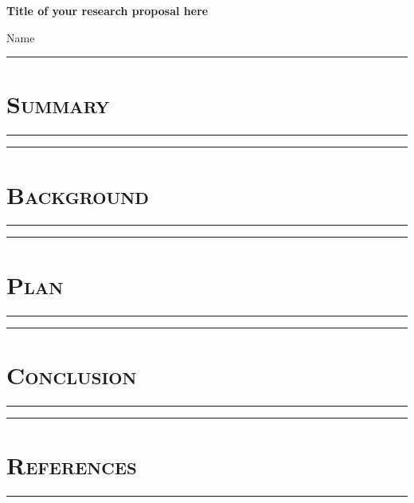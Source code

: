 \documentclass[10pt]{article} %
\begin{document}
\begin{center}
{\bf Title of your research proposal here} %
\end{center}

\begin{center}
Name
\end{center}

\begin{center}
    \par\noindent\rule{\textwidth}{0.2pt}
    \section*{\textsc{\textmd{Summary}}}
    \par\noindent\rule{\textwidth}{0.2pt}
\end{center}


\begin{center}
    \par\noindent\rule{\textwidth}{0.2pt}
    \section*{\textsc{\textmd{Background}}}
    \par\noindent\rule{\textwidth}{0.2pt}
\end{center}


\begin{center}
    \par\noindent\rule{\textwidth}{0.2pt}
    \section*{\textsc{\textmd{Plan}}}
    \par\noindent\rule{\textwidth}{0.2pt}
\end{center}


\begin{center}
    \par\noindent\rule{\textwidth}{0.2pt}
    \section*{\textsc{\textmd{Conclusion}}}
    \par\noindent\rule{\textwidth}{0.2pt}
\end{center}


\begin{center}
    \par\noindent\rule{\textwidth}{0.2pt}
    \section*{\textsc{\textmd{References}}}
    \par\noindent\rule{\textwidth}{0.2pt}
\end{center}

\begingroup
\renewcommand{\section}[2]{}%


\endgroup
\end{document}

